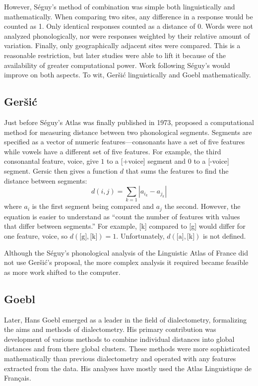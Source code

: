 \documentclass[11pt]{article}
\begin{document}
However, S\'eguy's method of combination was simple both
linguistically and mathematically. When comparing two sites, any
difference in a response would be counted as 1. Only identical
responses counted as a distance of 0. Words were not analyzed
phonologically, nor were responses weighted by their relative amount
of variation. Finally, only geographically adjacent sites were
compared. This is a reasonable restriction, but later studies were
able to lift it because of the availability of greater computational
power. Work following S\'eguy's would improve on both aspects. To wit,
Ger\v{s}i\'c linguistically and Goebl mathematically.

\subsection{Ger\v{s}i\'c}
Just before S\'eguy's Atlas was finally published in 1973,
 proposed a computational method for measuring
distance between two phonological segments. Segments are specified as
a vector of numeric features---consonants have a set of five features
while vowels have a different set of five features.  For example, the
third consonantal feature, voice, give $1$ to a [+voice] segment and
$0$ to a [-voice] segment. Gersic then gives a function $d$ that sums
the features to find the distance between segments:
\[ d(i,j) = \sum_{k=1} |a_{i_k} - a_{j_k}|\] where $a_i$ is the first
segment being compared and $a_j$ the second. However, the equation is
easier to understand as ``count the
number of features with values that differ between segments.'' For
example, [k] compared to [g] would differ for one feature, voice, so
$d(\textrm{[g]},\textrm{[k]}) = 1$. Unfortunately, $d(\textrm{[a]},
\textrm{[k]})$ is not defined.

Although the S\'eguy's phonological analysis of the Linguistic Atlas
of France did not use Ger\v{s}i\'c's proposal, the more complex
analysis it required became feasible as more work shifted to the computer.

\subsection{Goebl}

Later, Hans Goebl emerged as a leader in the field of dialectometry,
formalizing the aims and methods of dialectometry. His primary
contribution was development of various methods to combine individual
distances into global distances and from there global clusters. These
methods were more sophisticated mathematically than previous
dialectometry and operated with any features extracted from the data. His
analyses have mostly used the Atlas Linguistique de Fran\c{c}ais.
\end{document}
